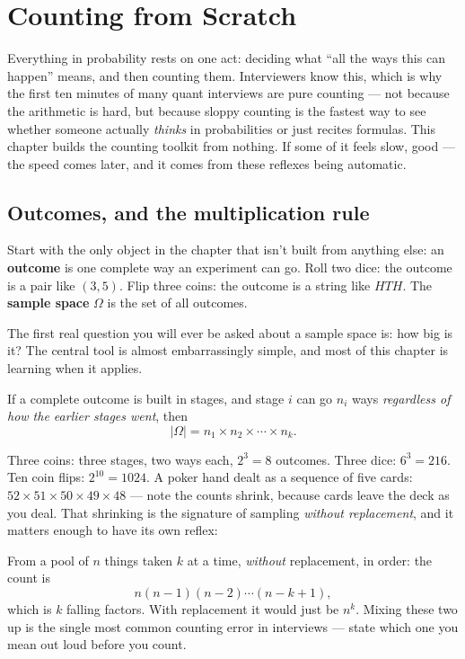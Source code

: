 \chapter{Counting from Scratch}\label{ch:counting}

Everything in probability rests on one act: deciding what ``all the ways this can happen'' means, and then counting them. Interviewers know this, which is why the first ten minutes of many quant interviews are pure counting --- not because the arithmetic is hard, but because sloppy counting is the fastest way to see whether someone actually \emph{thinks} in probabilities or just recites formulas. This chapter builds the counting toolkit from nothing. If some of it feels slow, good --- the speed comes later, and it comes from these reflexes being automatic.

\section{Outcomes, and the multiplication rule}

Start with the only object in the chapter that isn't built from anything else: an \textbf{outcome} is one complete way an experiment can go. Roll two dice: the outcome is a pair like $(3,5)$. Flip three coins: the outcome is a string like $HTH$. The \textbf{sample space} $\Omega$ is the set of all outcomes.

The first real question you will ever be asked about a sample space is: how big is it? The central tool is almost embarrassingly simple, and most of this chapter is learning when it applies.

\begin{notebox}
If a complete outcome is built in stages, and stage $i$ can go $n_i$ ways \emph{regardless of how the earlier stages went}, then
\[
|\Omega| = n_1 \times n_2 \times \cdots \times n_k.
\]
\end{notebox}

Three coins: three stages, two ways each, $2^3 = 8$ outcomes. Three dice: $6^3 = 216$. Ten coin flips: $2^{10} = 1024$. A poker hand dealt as a sequence of five cards: $52 \times 51 \times 50 \times 49 \times 48$ --- note the counts shrink, because cards leave the deck as you deal. That shrinking is the signature of sampling \emph{without replacement}, and it matters enough to have its own reflex:

\begin{probe}
From a pool of $n$ things taken $k$ at a time, \emph{without} replacement, in order: the count is
\[
n(n-1)(n-2)\cdots(n-k+1),
\]
which is $k$ falling factors. With replacement it would just be $n^k$. Mixing these two up is the single most common counting error in interviews --- state which one you mean out loud before you count.
\end{probe}

